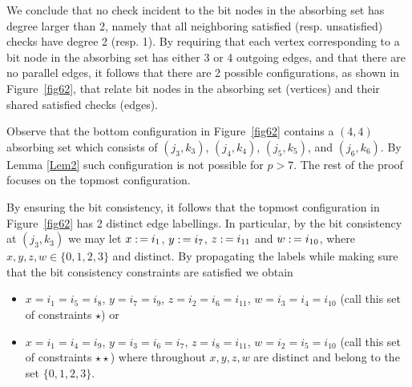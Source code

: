 We conclude that no check incident to the bit nodes in the absorbing
set has degree larger than 2, namely that all neighboring satisfied
(resp. unsatisfied) checks have degree 2 (resp. 1). By requiring
that each vertex corresponding to a bit node in the absorbing set
has either 3 or 4 outgoing edges, and that there are no parallel
edges, it follows that there are 2 possible configurations, as shown
in Figure~\ref{fig62}, that relate bit nodes in the absorbing set
(vertices) and their shared satisfied checks (edges).

Observe that the bottom configuration in Figure~\ref{fig62}
contains a $(4,4)$ absorbing set which consists of $(j_3,k_3)$,
$(j_4,k_4)$, $(j_5,k_5)$, and $(j_6,k_6)$. By Lemma \ref{Lem2}
such configuration is not possible for $p>7$. The rest of the
proof focuses on the topmost configuration.

 By ensuring the bit consistency, it follows that the topmost
configuration in Figure~\ref{fig62} has 2 distinct edge labellings.
In particular, by the bit consistency at $(j_3,k_3)$ we may let $x
\asn i_1$, $y \asn i_7$, $z \asn i_{11}$ and $w \asn i_{10}$, where
$x,y,z,w \in \{0,1,2,3\}$ and distinct. By propagating the labels
while making sure that the bit consistency constraints are satisfied
we obtain


\begin{itemize}
\item $x=i_1=i_5=i_8$, $y=i_7=i_9$, $z=i_2=i_6=i_{11}$,
$w=i_3=i_4=i_{10}$ (call this set of constraints $\star$) or \item
$x=i_1=i_4=i_9$, $y=i_3=i_6=i_7$, $z=i_8=i_{11}$,
$w=i_2=i_5=i_{10}$ (call this set of constraints $\star\star$)
where throughout $x,y,z,w$ are distinct and belong to the set
$\{0,1,2,3\}$.
\end{itemize}


